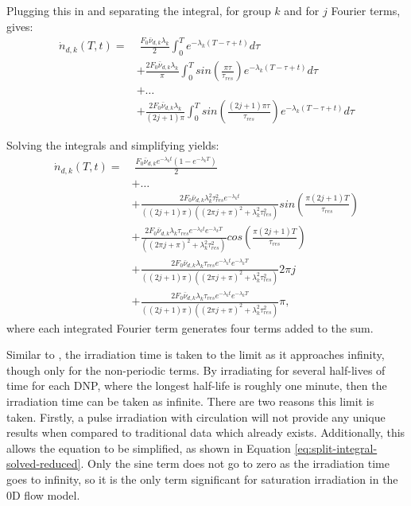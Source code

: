Plugging this in and separating the integral, for group $k$ and for $j$ Fourier terms, gives:
\begin{equation}
\begin{split}
    \dot{n}_{d, k}(T, t) =& \; \frac{F_0 \bar{\nu}_{d, k} \lambda_k}{2} \int_{0}^{T} e^{-\lambda_k \left( T-\tau + t \right)} d\tau\\
    & + \frac{2 F_0 \bar{\nu}_{d, k} \lambda_k}{\pi} \int_{0}^{T} sin \left( \frac{\pi \tau}{\tau_{res}}  \right) e^{-\lambda_k \left( T-\tau + t \right)} d\tau\\
    & + \dots\\
    & + \frac{2 F_0 \bar{\nu}_{d, k} \lambda_k}{(2j+1) \pi} \int_{0}^{T} sin \left( \frac{(2j+1) \pi \tau}{\tau_{res}}  \right) e^{-\lambda_k \left( T-\tau + t \right)} d\tau
    \label{eq:split-integral}
\end{split}
\end{equation}

Solving the integrals and simplifying yields: 
\begin{equation}
\begin{split}
    \dot{n}_{d, k}(T, t) =& \; \frac{F_0 \bar{\nu}_{d, k} e^{-\lambda_k t} \left( 1 - e^{-\lambda_k T} \right)}{2}\\
    & + \dots\\
    & + \frac{2 F_0 \bar{\nu}_{d, k} \lambda_k^2 \tau_{res}^2 e^{-\lambda_k t} }{\left( (2j+1) \pi \right) \left( (2 \pi j + \pi)^2 + \lambda_k^2 \tau_{res}^2 \right)} sin\left( \frac{\pi (2j+1) T}{\tau_{res}} \right)\\
    & + \frac{2 F_0 \bar{\nu}_{d, k} \lambda_k \tau_{res} e^{-\lambda_k t} e^{-\lambda_k T}}{\left( (2 \pi j + \pi)^2 + \lambda_k^2 \tau_{res}^2 \right)} cos\left( \frac{\pi (2j+1) T}{\tau_{res}} \right)  \\
    & + \frac{2 F_0 \bar{\nu}_{d, k} \lambda_k \tau_{res} e^{-\lambda_k t} e^{-\lambda_k T}}{\left( (2j+1) \pi \right) \left( (2 \pi j + \pi)^2 + \lambda_k^2 \tau_{res}^2 \right)} 2 \pi j  \\
    & + \frac{2 F_0 \bar{\nu}_{d, k} \lambda_k \tau_{res} e^{-\lambda_k t} e^{-\lambda_k T}}{\left( (2j+1) \pi \right) \left( (2 \pi j + \pi)^2 + \lambda_k^2 \tau_{res}^2 \right)} \pi,
    \label{eq:split-integral-solved}
\end{split}
\end{equation}
where each integrated Fourier term generates four terms added to the sum.

Similar to \cite{wilson2002delayed}, the irradiation time is taken to the limit as it approaches infinity, though only for the non-periodic terms.
By irradiating for several half-lives of time for each \gls{DNP}, where the longest half-life is roughly one minute, then the irradiation time can be taken as infinite. 
There are two reasons this limit is taken.
Firstly, a pulse irradiation with circulation will not provide any unique results when compared to traditional data which already exists.
Additionally, this allows the equation to be simplified, as shown in Equation \eqref{eq:split-integral-solved-reduced}.
Only the sine term does not go to zero as the irradiation time goes to infinity, so it is the only term significant for saturation irradiation in the 0D flow model.


